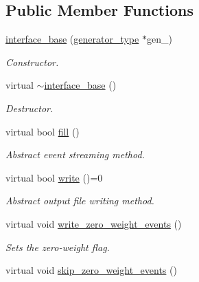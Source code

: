 \subsection*{Public Member Functions}
\begin{DoxyCompactItemize}
\item 
\hypertarget{a00317_ad5aa280d9d5791db4c4bfa3ab21a71a0}{}\hyperlink{a00317_ad5aa280d9d5791db4c4bfa3ab21a71a0}{interface\+\_\+base} (\hyperlink{a00451}{generator\+\_\+type} $\ast$gen\+\_\+)\label{a00317_ad5aa280d9d5791db4c4bfa3ab21a71a0}

\begin{DoxyCompactList}\small\item\em Constructor. \end{DoxyCompactList}\item 
\hypertarget{a00317_af811ce3f77ff217011b339a53f2507ee}{}virtual \hyperlink{a00317_af811ce3f77ff217011b339a53f2507ee}{$\sim$interface\+\_\+base} ()\label{a00317_af811ce3f77ff217011b339a53f2507ee}

\begin{DoxyCompactList}\small\item\em Destructor. \end{DoxyCompactList}\item 
\hypertarget{a00317_ae5dbd7fe97bb31ed80a4d4602a963e31}{}virtual bool \hyperlink{a00317_ae5dbd7fe97bb31ed80a4d4602a963e31}{fill} ()\label{a00317_ae5dbd7fe97bb31ed80a4d4602a963e31}

\begin{DoxyCompactList}\small\item\em Abstract event streaming method. \end{DoxyCompactList}\item 
\hypertarget{a00317_a4ab5edd1d5ba146243849269ade7a199}{}virtual bool \hyperlink{a00317_a4ab5edd1d5ba146243849269ade7a199}{write} ()=0\label{a00317_a4ab5edd1d5ba146243849269ade7a199}

\begin{DoxyCompactList}\small\item\em Abstract output file writing method. \end{DoxyCompactList}\item 
\hypertarget{a00317_a2c638c7f905e650c1efda5cdabcd8896}{}virtual void \hyperlink{a00317_a2c638c7f905e650c1efda5cdabcd8896}{write\+\_\+zero\+\_\+weight\+\_\+events} ()\label{a00317_a2c638c7f905e650c1efda5cdabcd8896}

\begin{DoxyCompactList}\small\item\em Sets the zero-\/weight flag. \end{DoxyCompactList}\item 
\hypertarget{a00317_a714ae03167e9ecdb3c0c03774a191089}{}virtual void \hyperlink{a00317_a714ae03167e9ecdb3c0c03774a191089}{skip\+\_\+zero\+\_\+weight\+\_\+events} ()\label{a00317_a714ae03167e9ecdb3c0c03774a191089}


\end{DoxyCompactItemize}
